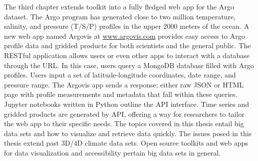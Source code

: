 The third chapter extends toolkit into a fully fledged web app for the Argo dataset. The Argo program has generated close to two million temperature, salinity, and pressure (T/S/P) profiles in the upper 2000 meters of the ocean. A new web app named Argovis at \url{www.argovis.com} provides easy access to Argo profile data and gridded products for both scientists and the general public. The RESTful application allows users or even other apps to interact with a database through the URL. In this case, users query a MongoDB database filled with Argo profiles. Users input a set of latitude-longitude coordinates, date range, and pressure range. The Argovis app sends a response: either raw JSON or HTML page with profile measurements and metadata that fall within these queries. Jupyter notebooks written in Python outline the API interface. Time series and gridded products are generated by API, offering a way for researchers to tailor the web app to their specific needs. 
The topics covered in this thesis entail big data sets and how to visualize and retrieve data quickly. The issues posed in this thesis extend past 3D/4D climate data sets. Open source toolkits and web apps for data visualization and accessibility pertain big data sets in general. 


